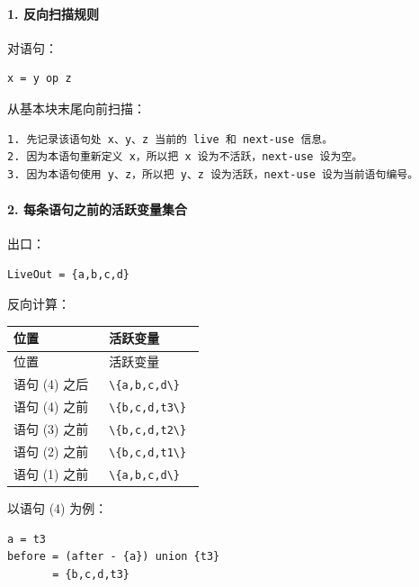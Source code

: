 \documentclass[UTF8]{ctexart}
\begin{document}
\paragraph*{1. 反向扫描规则}

对语句：

\begin{Verbatim}[fontsize=\small,breaklines=true]
x = y op z
\end{Verbatim}

从基本块末尾向前扫描：

\begin{Verbatim}[fontsize=\small,breaklines=true]
1. 先记录该语句处 x、y、z 当前的 live 和 next-use 信息。
2. 因为本语句重新定义 x，所以把 x 设为不活跃，next-use 设为空。
3. 因为本语句使用 y、z，所以把 y、z 设为活跃，next-use 设为当前语句编号。
\end{Verbatim}

\paragraph*{2. 每条语句之前的活跃变量集合}

出口：

\begin{Verbatim}[fontsize=\small,breaklines=true]
LiveOut = {a,b,c,d}
\end{Verbatim}

反向计算：

\begin{longtable}{|p{0.47\linewidth}|p{0.47\linewidth}|}
\hline
位置 & 活跃变量 \\
\hline
\endfirsthead
位置 & 活跃变量 \\
\hline
\endhead
语句 (4) 之后 & \texttt{\textbackslash{}\{a,b,c,d\textbackslash{}\}} \\
\hline
语句 (4) 之前 & \texttt{\textbackslash{}\{b,c,d,t3\textbackslash{}\}} \\
\hline
语句 (3) 之前 & \texttt{\textbackslash{}\{b,c,d,t2\textbackslash{}\}} \\
\hline
语句 (2) 之前 & \texttt{\textbackslash{}\{b,c,d,t1\textbackslash{}\}} \\
\hline
语句 (1) 之前 & \texttt{\textbackslash{}\{a,b,c,d\textbackslash{}\}} \\
\hline
\end{longtable}

以语句 (4) 为例：

\begin{Verbatim}[fontsize=\small,breaklines=true]
a = t3
before = (after - {a}) union {t3}
       = {b,c,d,t3}
\end{Verbatim}
\end{document}
